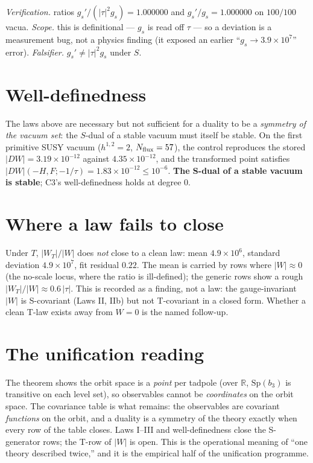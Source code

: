 \documentclass[11pt]{article}
\newcommand{\bthree}{b_3}
\newcommand{\flux}{F}
\newcommand{\hh}{H}
\newcommand{\tauu}{\tau}
\begin{document}
\textit{Verification.} ratios $g_s'/(|\tauu|^2 g_s)=1.000000$ and $g_s'/g_s=1.000000$
on $100/100$ vacua. \textit{Scope.} this is definitional --- $g_s$ is read off $\tauu$
--- so a deviation is a measurement bug, not a physics finding (it exposed an earlier
``$g_s\to 3.9\times10^7$'' error). \textit{Falsifier.} $g_s'\neq|\tauu|^2 g_s$ under
$S$.

\section{Well-definedness}

The laws above are necessary but not sufficient for a duality to be a \emph{symmetry
of the vacuum set}: the $S$-dual of a stable vacuum must itself be stable. On the
first primitive SUSY vacuum ($h^{1,2}=2$, $N_{\rm flux}=57$), the control reproduces
the stored $|DW|=3.19\times10^{-12}$ against $4.35\times10^{-12}$, and the transformed
point satisfies $|DW|(-\hh,\flux;-1/\tauu)=1.83\times10^{-12}\le10^{-6}$. \textbf{The
S-dual of a stable vacuum is stable}; C3's well-definedness holds at degree 0.

\section{Where a law fails to close}

Under $T$, $|W_T|/|W|$ does \emph{not} close to a clean law: mean $4.9\times10^6$,
standard deviation $4.9\times10^7$, fit residual $0.22$. The mean is carried by rows
where $|W|\approx0$ (the no-scale locus, where the ratio is ill-defined); the generic
rows show a rough $|W_T|/|W|\approx0.6\,|\tauu|$. This is recorded as a finding, not a
law: the gauge-invariant $|W|$ is S-covariant (Laws II, IIb) but not T-covariant in a
closed form. Whether a clean T-law exists away from $W=0$ is the named follow-up.

\section{The unification reading}

The theorem \cite{constraint-first} shows the orbit space is a \emph{point} per tadpole
(over $\mathbb{R}$, $\mathrm{Sp}(\bthree)$ is transitive on each level set), so
observables cannot be \emph{coordinates} on the orbit space. The covariance table is
what remains: the observables are covariant \emph{functions} on the orbit, and a
duality is a symmetry of the theory exactly when every row of the table closes. Laws
I--III and well-definedness close the S-generator rows; the T-row of $|W|$ is open.
This is the operational meaning of ``one theory described twice,'' and it is the
empirical half of the unification programme.
\end{document}
